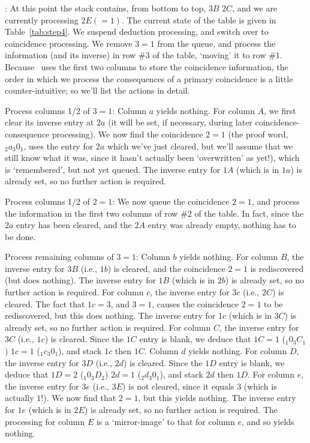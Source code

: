:
At this point the stack contains, from bottom to top, $3B$ \amp $2C$, and
  we are currently processing $2E(=1)$.
The current state of the table is given in Table~\ref{tab:step4}.
We suspend deduction processing, and switch over to coincidence processing.
We remove $3=1$ from the queue, and process the information (and its
  inverse) in row \#$3$ of the table, `moving' it to row \#$1$.
Because \ace\ uses the first two columns to store the coincidence
  information, the order in which we process the consequences of a primary
  coincidence is a little counter-intuitive; so we'll list the actions
  in detail.

Process columns 1/2 of $3=1$:
Column $a$ yields nothing.
For column $A$, we first clear its inverse entry at $2a$ (it will be set,
  if necessary, during later coincidence-consequence processing).
We now find the coincidence $2=1$ (the proof word, $_2 a_3 0_1$, uses
  the entry for $2a$ which we've just cleared, but we'll assume that we
  still know what it was, since it hasn't actually been `overwritten'
  as yet!), which is `remembered'\kern-1.5pt, but not yet queued.
The inverse entry for $1A$ (which is in $1a$) is already set, so no
  further action is required.

Process columns 1/2 of $2=1$:
We now queue the coincidence $2=1$, and process the information in the
  first two columns of row \#$2$ of the table.
In fact, since the $2a$ entry has been cleared, and the $2A$ entry was
  already empty, nothing has to be done.

Process remaining columns of $3=1$:
Column $b$ yields nothing.
%
For column $B$, the inverse entry for $3B$ (i.e., $1b$) is cleared, and the
  coincidence $2=1$ is rediscovered (but does nothing).
The inverse entry for $1B$ (which is in $2b$) is already set, so no
  further action is required.
%
For column $c$, the inverse entry for $3c$ (i.e., $2C$) is cleared.
The fact that $1c=3$, and $3=1$, causes the coincidence $2=1$ to be
  rediscovered, but this does nothing.
The inverse entry for $1c$ (which is in $3C$) is already set, so no
  further action is required.
%
For column $C$, the inverse entry for $3C$ (i.e., $1c$) is cleared.
Since the $1C$ entry is blank, we deduce that $1C=1$ ($_1 0_3 C_1$) \amp
  $1c=1$ ($_1 c_3 0_1$), and stack $1c$ then $1C$.
%
Column $d$ yields nothing.
%
For column $D$, the inverse entry for $3D$ (i.e., $2d$) is cleared.
Since the $1D$ entry is blank, we deduce that $1D=2$ ($_1 0_3 D_2$) \amp
  $2d=1$ ($_2 d_3 0_1$), and stack $2d$ then $1D$.
%
For column $e$, the inverse entry for $3e$ (i.e., $3E$) is not cleared,
  since it equals $3$ (which is actually $1$!).
We now find that $2=1$, but this yields nothing.
The inverse entry for $1e$ (which is in $2E$) is already set, so no
  further action is required.
%
The processing for column $E$ is a `mirror-image' to that for column $e$,
  and so yields nothing.


